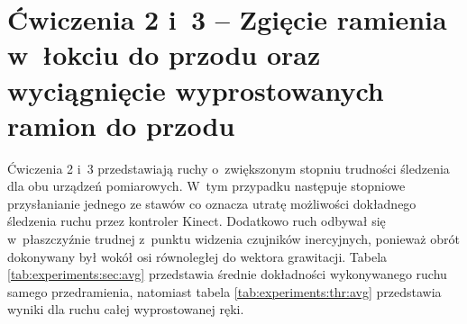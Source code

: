 \section*{Ćwiczenia 2 i~3 -- Zgięcie ramienia w~łokciu do przodu oraz wyciągnięcie wyprostowanych ramion do przodu}
Ćwiczenia 2 i~3 przedstawiają ruchy o~zwiększonym stopniu trudności śledzenia dla obu urządzeń pomiarowych. W~tym przypadku następuje stopniowe przysłanianie jednego ze stawów co oznacza utratę możliwości dokładnego śledzenia ruchu przez kontroler Kinect. Dodatkowo ruch odbywał się w~płaszczyźnie trudnej z~punktu widzenia czujników inercyjnych, ponieważ obrót dokonywany był wokół osi równoległej do wektora grawitacji. Tabela \ref{tab:experiments:sec:avg} przedstawia średnie dokładności wykonywanego ruchu samego przedramienia, natomiast tabela \ref{tab:experiments:thr:avg} przedstawia wyniki dla ruchu całej wyprostowanej ręki.


